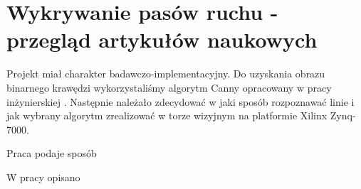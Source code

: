 \section{Wykrywanie pasów ruchu - przegląd artykułów naukowych}

Projekt miał charakter badawczo-implementacyjny. Do uzyskania obrazu binarnego krawędzi wykorzystaliśmy algorytm Canny opracowany w pracy inżynierskiej \cite{inz-canny}. Następnie należało zdecydować w jaki sposób rozpoznawać linie i jak wybrany algorytm zrealizować w torze wizyjnym na platformie Xilinx Zynq-7000.

Praca \cite{kapruziak} podaje sposób

W pracy \cite{hardware-accelerator} opisano






